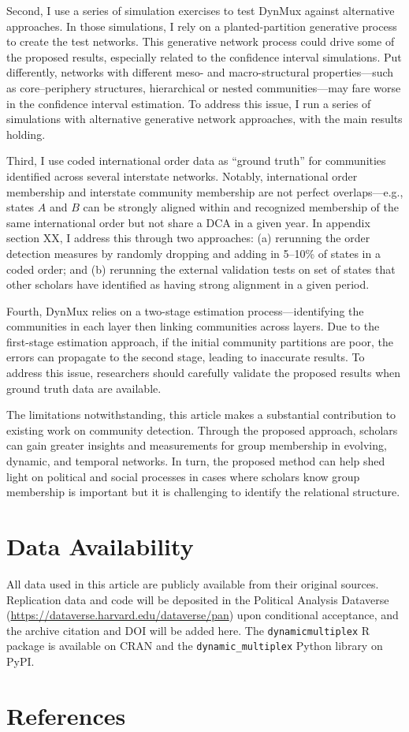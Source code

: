 \documentclass[11pt, letterpaper]{article}
\begin{document}
Second, I use a series of simulation exercises to test DynMux  against alternative approaches. In those simulations, I rely on a planted-partition generative process to create the test networks. This generative network process could drive some of the proposed results, especially related to the confidence interval simulations. Put differently, networks with different meso- and macro-structural properties---such as core–periphery structures, hierarchical or nested communities---may fare worse in the confidence interval estimation. To address this issue, I run a series of simulations with alternative generative network approaches, with the main results holding.

Third, I use coded international order data as ``ground truth'' for communities identified across several interstate networks. Notably, international order membership and interstate community membership are not perfect overlaps---e.g., states $A$ and $B$ can be strongly aligned within and recognized membership of the same international order but not share a DCA in a given year. In appendix section XX, I address this through two approaches: (a) rerunning the order detection measures by randomly dropping and adding in 5--10\% of states in a coded order; and (b) rerunning the external validation tests on set of states that other scholars have identified as having strong alignment in a given period. 

Fourth, DynMux relies on a two-stage estimation process---identifying the communities in each layer then linking communities across layers. Due to the first-stage estimation approach, if the initial community partitions are poor, the errors can propagate to the second stage, leading to inaccurate results. To address this issue, researchers should carefully validate the proposed results when ground truth data are available. 

The limitations notwithstanding, this article makes a substantial contribution to existing work on community detection. Through the proposed approach, scholars can gain greater insights and measurements for group membership in evolving, dynamic, and temporal networks. In turn, the proposed method can help shed light on political and social processes in cases where scholars know group membership is important but it is challenging to identify the relational structure. 

\section*{Data Availability}
All data used in this article are publicly available from their original sources. Replication data and code will be deposited in the Political Analysis Dataverse (\url{https://dataverse.harvard.edu/dataverse/pan})
upon conditional acceptance, and the archive citation and DOI will be added here. The \texttt{dynamicmultiplex} R package is available on CRAN and the \texttt{dynamic\_multiplex} Python library on PyPI.

\section*{References}

\doublespacing



\end{document}
